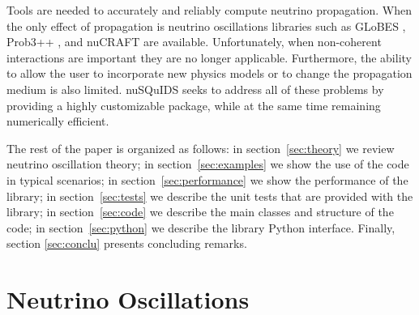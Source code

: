 \documentclass[3p,12pt]{elsarticle}
\newcommand{\ttf}{\ttfamily}
\begin{document}
Tools are needed to accurately and reliably compute neutrino
propagation.
When the only effect of propagation is neutrino oscillations libraries such as {\ttf GLoBES}
\citep{Huber:2007ji}, {\ttf Prob3++} \citep{prob3pp, Calland:2013vaa},
and {\ttf nuCRAFT} \citep{Wallraff:2014vl} are
available. Unfortunately, when non-coherent interactions are 
important they are no longer applicable. Furthermore, the ability to
allow the user to incorporate new physics models or to change the
propagation medium is also limited. {\ttf nuSQuIDS} seeks to
address all of these problems by providing a highly customizable
package, while at the same time remaining numerically efficient.

The rest of the paper is organized as follows: in section~\ref{sec:theory}
we review neutrino oscillation theory; in section~\ref{sec:examples}
we show the use of the code in typical
scenarios; in section~\ref{sec:performance} we show the performance of
the library; in section~\ref{sec:tests} we describe the unit tests that
are provided with the library; in section~\ref{sec:code} we describe
the main classes and structure of the code; in section~\ref{sec:python}
we describe the library {\ttf Python} interface. Finally, section
\ref{sec:conclu} presents concluding remarks.

\section{Neutrino Oscillations}
\end{document}
